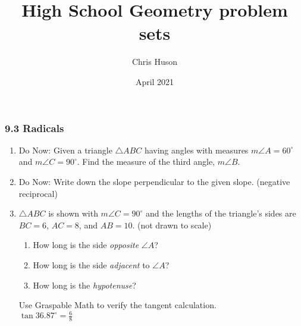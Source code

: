 \documentclass[12pt, twoside]{article}
\title{High School Geometry problem sets}
\author{Chris Huson}
\date{April 2021}
\begin{document}
\subsubsection*{9.3 Radicals}
\begin{enumerate}
\item Do Now: Given a triangle $\triangle ABC$ having angles with measures $m\angle A = 60^\circ$ and $m\angle C = 90^\circ$. Find the measure of the third angle, $m\angle B$.

\newpage
\item Do Now: Write down the slope perpendicular to the given slope. (negative reciprocal) \vspace{0.5cm}
\begin{enumerate}
\end{enumerate}

\newpage
\item $\triangle ABC$ is shown with $m\angle C=90^\circ$ and the lengths of the triangle's sides are $BC=6$, $AC=8$, and $AB=10$. (not drawn to scale)
  \begin{multicols}{2}
    \begin{enumerate}
      \item How long is the side \emph{opposite} $\angle A$? \vspace{0.75cm}
      \item How long is the side \emph{adjacent} to $\angle A$? \vspace{0.75cm}
      \item How long is the \emph{hypotenuse}? \vspace{0.75cm}
    \end{enumerate}
    \end{multicols}
    Use Graspable Math to verify the tangent calculation.\\[0.25cm]
      $\displaystyle \tan 36.87^\circ = \frac{6}{8}$


\end{enumerate}
\end{document}
